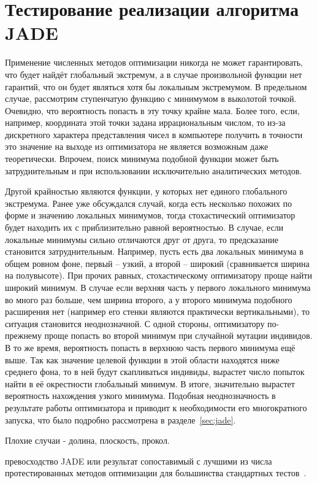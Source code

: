\section{Тестирование реализации алгоритма JADE}
\label{sec:test-jade}
Применение численных методов оптимизации никогда не может
гарантировать, что будет найдёт глобальный экстремум, а в случае
произвольной функции нет гарантий, что он будет являться
хотя бы локальным экстремумом.  В предельном случае, рассмотрим ступенчатую
функцию с минимумом в выколотой точкой.  Очевидно, что вероятность
попасть в эту точку крайне мала.  Более того, если, например,
координата этой точки задана иррациональным числом, то из-за
дискретного характера представления чисел в компьютере получить в
точности это значение на выходе из оптимизатора не является возможным
даже теоретически.  Впрочем, поиск минимума подобной функции может
быть затруднительным и при использовании исключительно аналитических
методов.

Другой крайностью являются функции, у которых нет единого глобального
экстремума.  Ранее уже обсуждался случай, когда есть несколько похожих
по форме и значению локальных минимумов, тогда стохастический
оптимизатор будет находить их с приблизительно равной вероятностью.  В
случае, если локальные минимумы сильно отличаются друг от друга, то
предсказание становится затруднительным.  Например, пусть есть два
локальных минимума в общем ровном фоне, первый -- узкий, а второй --
широкий (сравнивается ширина на полувысоте). При прочих равных,
стохастическому оптимизатору проще найти широкий минимум. В
случае если верхняя часть у первого локального минимума во много раз
больше, чем ширина второго, а у второго минимума подобного расширения
нет (например его стенки являются практически вертикальными), то
ситуация становится неоднозначной.  С одной стороны, оптимизатору
по-прежнему проще попасть во второй минимум при случайной мутации
индивидов. В то же время, вероятность попасть в верхнюю часть первого
минимума ещё выше. Так как значение целевой функции в этой области
находятся ниже среднего фона, то в ней будут скапливаться индивиды,
вырастет число попыток найти в её окрестности глобальный минимум.  В
итоге, значительно вырастет вероятность нахождения узкого минимума.
Подобная неоднозначность в результате работы оптимизатора и приводит к
необходимости его многократного запуска, что было подробно рассмотрена
в разделе~\ref{sec:jade}.


Плохие случаи - долина, плоскость, прокол.


превосходство JADE или результат сопоставимый с лучшими из числа
протестированных методов оптимизации для большинства стандартных
тестов~\cite{Schwefel-1981,Rosenbrock-1960,Muhlenbein-1991,back-1996,Griewank-1981}.

